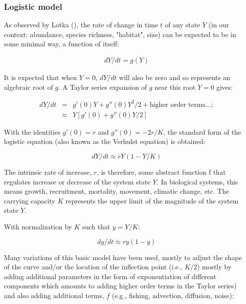 \documentclass[letterpaper,portrait,11pt]{scrartcl}
\numberwithin{equation}{section}		%
\numberwithin{figure}{section}		%
\numberwithin{table}{section}				%
\begin{document}
\subsubsection{Logistic model}

As observed by Lotka (\cite{lotka1925}), the rate of change in time $t$ of any state $Y$ (in our context: abundance, species richness, "habitat", size) can be expected to be in some minimal way, a function of itself:  

\begin{eqnarray} 
\label{eqLogisticContinuous}
dY / dt = g(Y)
\end{eqnarray}

It is expected that when $Y = 0$, $dY/dt$ will also be zero and so represents an algebraic root of $g$. A Taylor series expansion of $g$ near this root $Y=0$ gives:

\begin{eqnarray*} 
  \label{eqLogisticTaylorSeries}
  dY / dt &=&  g'(0) Y + g''(0) Y^{2}/2  + \text{higher order terms} \dots; \\
  &\approx& Y [g'(0) + g''(0) Y/2  ]
\end{eqnarray*}


With the identities $g'(0) = r$  and $g''(0) = - 2r/K$, the standard form of the logistic equation (also known as the Verhulst equation) is obtained:

\begin{equation} 
\label{eqLogistic}
dY/dt \approx r Y (1 - Y/K)
\end{equation}

The intrinsic rate of increase, $r$, is therefore, some abstract function f that regulates increase or decrease of the system state $Y$. In biological systems, this means growth, recruitment, mortality,  movement, climatic change, etc. The carrying capacity $K$ represents the upper limit of the magnitude of the system state $Y$.

With normalization by $K$ such that $ y = Y/K $:

\begin{equation} 
\label{eqLogisticBasic}
dy/dt  \approx  r y (1 - y)
\end{equation}

Many variations of this basic model have been used, mostly to adjust the shape of the curve and/or the location of the inflection point (i.e., $K/2$) mostly by adding additional parameters in the form of exponentiation of different components which amounts to adding higher order terms in the Taylor series) and also adding additional terms, $f$ (e.g., fishing, advection, diffusion, noise): 
\end{document}

